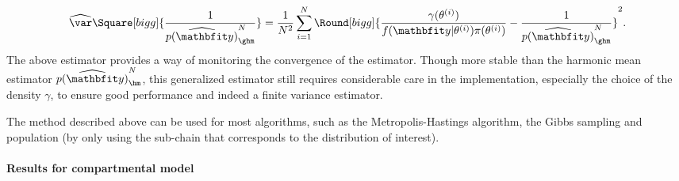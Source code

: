 \begin{equation}
  \widehat{\var}\Square[bigg]{\frac{1}{\widehat{p(\data)}_{\ghm}^N}} =
  \frac{1}{N^2}\sum_{i=1}^N \Round[bigg]{
    \frac{\gamma(\theta^{(i)})}{f(\data|\theta^{(i)})\pi(\theta^{(i)})}
    - \frac{1}{\widehat{p(\data)}_{\ghm}^N}}^2.
\end{equation}
The above estimator provides a way of monitoring the convergence of the estimator. Though more stable than the harmonic mean estimator $\widehat{p(\data)}_{\hm}^N$, this generalized estimator still requires considerable care in the implementation, especially the choice of the density $\gamma$, to ensure good performance and indeed a finite variance estimator.

The method described above can be used for most \mcmc algorithms, such as the Metropolis-Hastings algorithm, the Gibbs sampling and population \mcmc (by only using the sub-chain that corresponds to the distribution of interest).

\paragraph{Results for \pet compartmental model}

